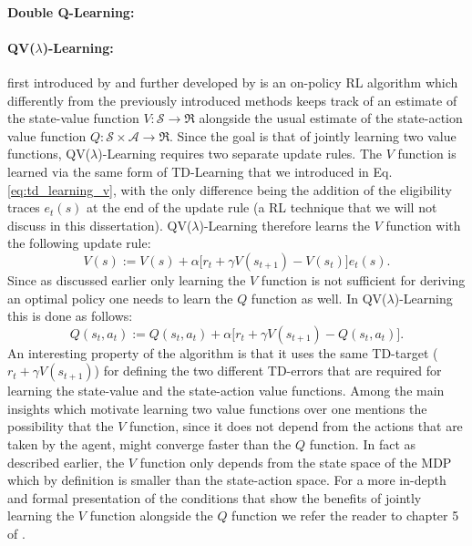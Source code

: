 \paragraph{Double Q-Learning:}


\paragraph{QV($\lambda$)-Learning:} first introduced by \citet{wiering2005qv} and further developed by \citet{wiering2009qv} is an on-policy RL algorithm which differently from the previously introduced methods keeps track of an estimate of the state-value function $V:\mathcal{S}\rightarrow\Re$ alongside the usual estimate of the state-action value function $Q:\mathcal{S}\times\mathcal{A}\rightarrow\Re$. Since the goal is that of jointly learning two value functions, QV($\lambda$)-Learning requires two separate update rules. The $V$ function is learned via the same form of TD-Learning that we introduced in Eq. \ref{eq:td_learning_v}, with the only difference being the addition of the eligibility traces $e_t(s)$ at the end of the update rule (a RL technique that we will not discuss in this dissertation). QV($\lambda$)-Learning therefore learns the $V$ function with the following update rule:
\begin{equation}
V(s):= V(s) + \alpha \big[ r_{t} + \gamma V(s_{t+1}) - V(s_t) \big] e_{t}(s).
\label{eq:qv_lambda_v_update}
\end{equation}
Since as discussed earlier only learning the $V$ function is not sufficient for deriving an optimal policy one needs to learn the $Q$ function as well. In QV($\lambda$)-Learning this is done as follows:
\begin{equation}
Q(s_{t}, a_{t}):= Q(s_{t}, a_{t}) + \alpha \big[r_{t} + \gamma V(s_{t+1}) - Q(s_{t}, a_{t}) \big].
\label{eq:qv_lambda_q_update}
\end{equation}
An interesting property of the algorithm is that it uses the same TD-target ($r_t + \gamma V(s_{t+1})$) for defining the two different TD-errors that are required for learning the state-value and the state-action value functions. Among the main insights which motivate learning two value functions over one \citet{wiering2005qv} mentions the possibility that the $V$ function, since it does not depend from the actions that are taken by the agent, might converge faster than the $Q$ function. In fact as described earlier, the $V$ function only depends from the state space of the MDP which by definition is smaller than the state-action space. For a more in-depth and formal presentation of the conditions that show the benefits of jointly learning the $V$ function alongside the $Q$ function we refer the reader to chapter 5 of \cite{van2011insights}.


